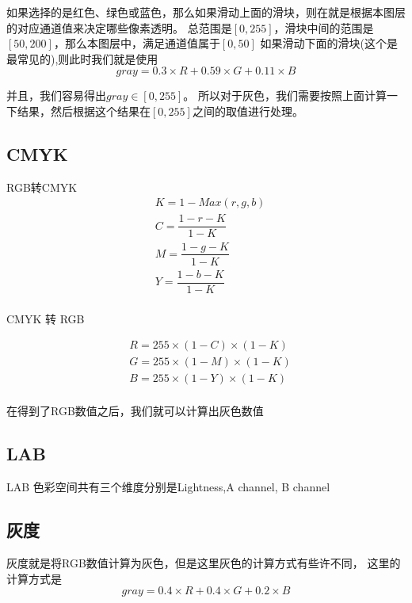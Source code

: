 如果选择的是红色、绿色或蓝色，那么如果滑动上面的滑块，则在就是根据本图层的对应通道值来决定哪些像素透明。
总范围是$[0,255]$，滑块中间的范围是$[50,200]$，那么本图层中，满足通道值属于$[0,50]$
如果滑动下面的滑块(这个是最常见的),则此时我们就是使用
\begin{equation}
gray=0.3\times R+0.59\times G + 0.11\times B
\end{equation}

并且，我们容易得出$gray\in [0,255]$。
所以对于灰色，我们需要按照上面计算一下结果，然后根据这个结果在$[0,255]$之间的取值进行处理。

\subsection{CMYK}
RGB转CMYK
\begin{equation}
	\begin{aligned}
	&K= 1-Max(r,g,b)\\
	&C= \dfrac{1-r-K}{1-K} \\
	&M= \dfrac{1-g-K}{1-K} \\
	&Y= \dfrac{1-b-K}{1-K} \\
	\end{aligned}
\end{equation}

CMYK 转 RGB

\begin{equation}
	\begin{aligned}
&R= 255 \times (1-C) \times (1-K)\\
&G= 255 \times (1-M) \times (1-K)\\
&B= 255 \times (1-Y) \times (1-K)\\
\end{aligned}
\end{equation}

在得到了RGB数值之后，我们就可以计算出灰色数值
\subsection{LAB}
LAB 色彩空间共有三个维度分别是Lightness,A channel, B channel

\subsection{灰度}
灰度就是将RGB数值计算为灰色，但是这里灰色的计算方式有些许不同，
这里的计算方式是
\begin{equation}
	gray=0.4\times R+0.4\times G + 0.2\times B
\end{equation}

